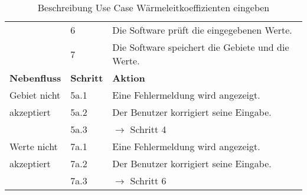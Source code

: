 \begin{table} [H]
\begin{tabular}{|l|l|l|}
		\cline{2-3}
		&	6	& Die Software prüft die eingegebenen Werte.\\
		\cline{2-3}
		&	7	& Die Software speichert die Gebiete und die Werte.\\
		\hline
		\textbf{Nebenfluss} & \textbf{Schritt} & \textbf{Aktion}\\
		\hline
		Gebiet nicht & 5a.1 & Eine Fehlermeldung wird angezeigt.\\
		\cline{2-3}
		akzeptiert 	& 5a.2	& Der Benutzer korrigiert seine Eingabe.\\
		\cline{2-3}
					& 5a.3 	& $\rightarrow$ Schritt 4\\
		\hline
		Werte nicht & 7a.1 	& Eine Fehlermeldung wird angezeigt.\\
		\cline{2-3}
		akzeptiert 	& 7a.2	& Der Benutzer korrigiert seine Eingabe.\\
		\cline{2-3}
					& 7a.3 	& $\rightarrow$ Schritt 6\\
		\hline
	\end{tabular}
	\caption{Beschreibung Use Case Wärmeleitkoeffizienten eingeben}
	\label{Beschreibung Use Case Wärmeleitkoeffizienten_eingeben}
\end{table}

